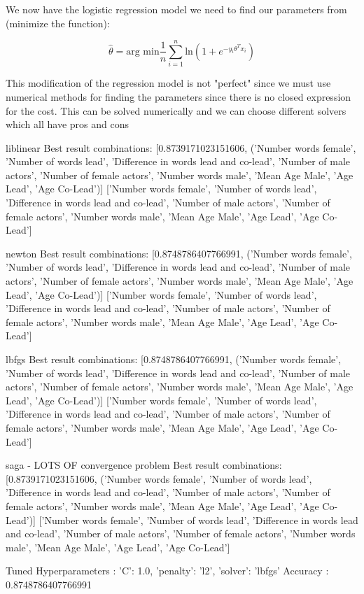 \documentclass[a4paper]{article}
\begin{document}
We now have the logistic regression model we need to find our parameters from (minimize the function):

\begin{equation}
\hat{\theta} = \text{arg min} \frac{1} {n} \sum_{i=1}^{n} \text{ln}(1+e^{-y_i\theta^{T}x_i})
\end{equation}

This modification of the regression model is not "perfect" since we must use numerical methods for finding the parameters since there is no closed expression for the cost. This can be solved numerically and we can choose different solvers which all have pros and cons





liblinear
Best result combinations: [0.8739171023151606, ('Number words female', 'Number of words lead', 'Difference in words lead and co-lead', 'Number of male actors', 'Number of female actors', 'Number words male', 'Mean Age Male', 'Age Lead', 'Age Co-Lead')]
['Number words female', 'Number of words lead', 'Difference in words lead and co-lead', 'Number of male actors', 'Number of female actors', 'Number words male', 'Mean Age Male', 'Age Lead', 'Age Co-Lead']

newton
Best result combinations: [0.8748786407766991, ('Number words female', 'Number of words lead', 'Difference in words lead and co-lead', 'Number of male actors', 'Number of female actors', 'Number words male', 'Mean Age Male', 'Age Lead', 'Age Co-Lead')]
['Number words female', 'Number of words lead', 'Difference in words lead and co-lead', 'Number of male actors', 'Number of female actors', 'Number words male', 'Mean Age Male', 'Age Lead', 'Age Co-Lead']

lbfgs
Best result combinations: [0.8748786407766991, ('Number words female', 'Number of words lead', 'Difference in words lead and co-lead', 'Number of male actors', 'Number of female actors', 'Number words male', 'Mean Age Male', 'Age Lead', 'Age Co-Lead')]
['Number words female', 'Number of words lead', 'Difference in words lead and co-lead', 'Number of male actors', 'Number of female actors', 'Number words male', 'Mean Age Male', 'Age Lead', 'Age Co-Lead']


saga - LOTS OF convergence problem
Best result combinations: [0.8739171023151606, ('Number words female', 'Number of words lead', 'Difference in words lead and co-lead', 'Number of male actors', 'Number of female actors', 'Number words male', 'Mean Age Male', 'Age Lead', 'Age Co-Lead')]
['Number words female', 'Number of words lead', 'Difference in words lead and co-lead', 'Number of male actors', 'Number of female actors', 'Number words male', 'Mean Age Male', 'Age Lead', 'Age Co-Lead']


Tuned Hyperparameters : {'C': 1.0, 'penalty': 'l2', 'solver': 'lbfgs'}
Accuracy : 0.8748786407766991




\end{document}
